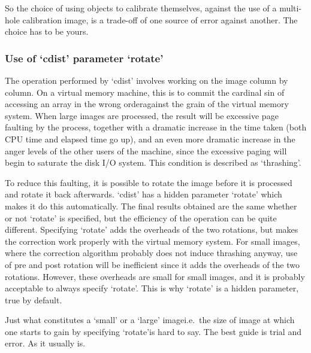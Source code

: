    So the choice of using objects to calibrate themselves, against the
   use of a multi-hole calibration image, is a trade-off of one source
   of error against another.  The choice has to be yours.


\subsubsection{\label{techno7cdist}Use of `cdist' parameter `rotate'}

   The operation performed by `cdist' involves working on the image
   column by column.  On a virtual memory machine, this is to commit the
   cardinal sin of accessing an array in the wrong
   order\latorhtm{---}{-}against the
   grain of the virtual memory system.  When large images are processed,
   the result will be excessive page faulting by the process, together
   with a dramatic increase in the time taken (both CPU time and elapsed
   time go up), and an even more dramatic increase in the anger levels
   of the other users of the machine, since the excessive paging will
   begin to saturate the disk I/O system.  This condition is described
   as `thrashing'.

   To reduce this faulting, it is possible to rotate the image before it
   is processed and rotate it back afterwards.  `cdist' has a hidden
   parameter `rotate' which makes it do this automatically.  The final
   results obtained are the same whether or not `rotate' is specified,
   but the efficiency of the operation can be quite different.
   Specifying `rotate' adds the overheads of the two rotations, but
   makes the correction work properly with the virtual memory system.
   For small images, where the correction algorithm probably does not
   induce thrashing anyway, use of pre and post rotation will be
   inefficient since it adds the overheads of the two rotations.
   However, these overheads are small for small images, and it is
   probably acceptable to always specify `rotate'.  This is why `rotate'
   is a hidden parameter, true by default.

   Just what constitutes a `small' or a `large'
   image\latorhtm{---}{-}i.e.\ the size of
   image at which one starts to gain by specifying
   `rotate'\latorhtm{---}{-}is hard to
   say.  The best guide is trial and error.  As it usually is.



